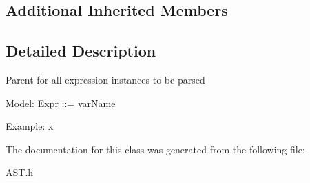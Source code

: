 \subsection*{Additional Inherited Members}


\subsection{Detailed Description}
Parent for all expression instances to be parsed \par
 

Model\-: \hyperlink{classExpr}{Expr} \-:\-:= var\-Name \par
 Example\-: x 

The documentation for this class was generated from the following file\-:\begin{DoxyCompactItemize}
\item 
\hyperlink{AST_8h}{A\-S\-T.\-h}\end{DoxyCompactItemize}
